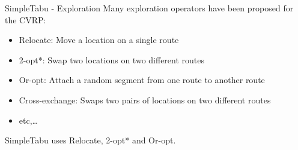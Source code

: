 \documentclass[9pt]{beamer}
\begin{document}
\begin{frame}{SimpleTabu - Exploration}
    Many exploration operators have been proposed for the CVRP:

    \begin{itemize}
        \item Relocate: Move a location on a single route
        \item 2-opt*: Swap two locations on two different routes
        \item Or-opt: Attach a random segment from one route to another route
        \item Cross-exchange: Swaps two pairs of locations on two different routes
        \item etc,\dots
    \end{itemize}

    SimpleTabu uses Relocate, 2-opt* and Or-opt.
\end{frame}
\end{document}
